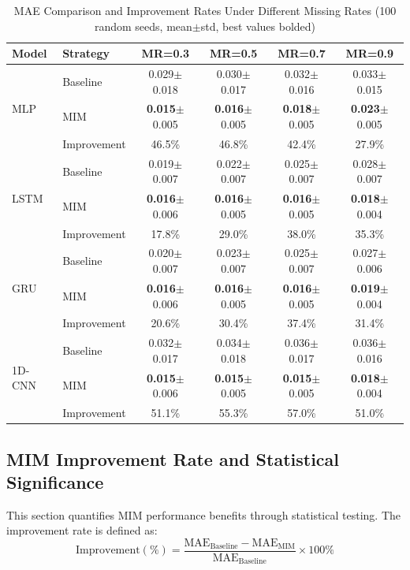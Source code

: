 \documentclass[5p,times]{elsarticle}
\begin{document}
\begin{table}[t]
\centering
\small
\caption{MAE Comparison and Improvement Rates Under Different Missing Rates (100 random seeds, mean$\pm$std, best values bolded)}
\label{tab:full_results}
\begin{tabular}{@{}llcccc@{}}
\toprule
\textbf{Model} & \textbf{Strategy} & \textbf{MR=0.3} & \textbf{MR=0.5} & \textbf{MR=0.7} & \textbf{MR=0.9} \\
\midrule
\multirow{3}{*}{MLP} 
& Baseline & 0.029$\pm$0.018 & 0.030$\pm$0.017 & 0.032$\pm$0.016 & 0.033$\pm$0.015 \\
& MIM & \textbf{0.015}$\pm$0.005 & \textbf{0.016}$\pm$0.005 & \textbf{0.018}$\pm$0.005 & \textbf{0.023}$\pm$0.005 \\
& Improvement & 46.5\% & 46.8\% & 42.4\% & 27.9\% \\
\midrule
\multirow{3}{*}{LSTM} 
& Baseline & 0.019$\pm$0.007 & 0.022$\pm$0.007 & 0.025$\pm$0.007 & 0.028$\pm$0.007 \\
& MIM & \textbf{0.016}$\pm$0.006 & \textbf{0.016}$\pm$0.005 & \textbf{0.016}$\pm$0.005 & \textbf{0.018}$\pm$0.004 \\
& Improvement & 17.8\% & 29.0\% & 38.0\% & 35.3\% \\
\midrule
\multirow{3}{*}{GRU} 
& Baseline & 0.020$\pm$0.007 & 0.023$\pm$0.007 & 0.025$\pm$0.007 & 0.027$\pm$0.006 \\
& MIM & \textbf{0.016}$\pm$0.006 & \textbf{0.016}$\pm$0.005 & \textbf{0.016}$\pm$0.005 & \textbf{0.019}$\pm$0.004 \\
& Improvement & 20.6\% & 30.4\% & 37.4\% & 31.4\% \\
\midrule
\multirow{3}{*}{1D-CNN} 
& Baseline & 0.032$\pm$0.017 & 0.034$\pm$0.018 & 0.036$\pm$0.017 & 0.036$\pm$0.016 \\
& MIM & \textbf{0.015}$\pm$0.006 & \textbf{0.015}$\pm$0.005 & \textbf{0.015}$\pm$0.005 & \textbf{0.018}$\pm$0.004 \\
& Improvement & 51.1\% & 55.3\% & 57.0\% & 51.0\% \\
\bottomrule
\end{tabular}
\end{table}

\subsection{MIM Improvement Rate and Statistical Significance}

This section quantifies MIM performance benefits through statistical testing. The improvement rate is defined as:
\begin{equation}
    \text{Improvement}(\%) = \frac{\text{MAE}_{\text{Baseline}} - \text{MAE}_{\text{MIM}}}{\text{MAE}_{\text{Baseline}}} \times 100\%
\end{equation}
\end{document}
